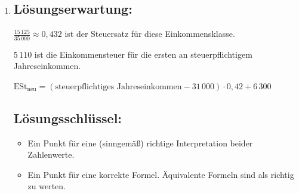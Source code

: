 \begin{langesbeispiel}
{\begin{enumerate}
\begin{itemize}
	\item Ein Punkt für eine (sinngemäß) richtige Begründung, warum die Behauptung (i) falsch ist.
	\item Ein Punkt für eine (sinngemäß) richtige Begründung, warum die Behauptung (ii) falsch ist.
\end{itemize}

\item \subsection{Lösungserwartung:}
			
$\frac{15\,125}{35\,000}\approx 0,432$ ist der Steuersatz für diese Einkommensklasse.

5\,110 ist die Einkommensteuer für die ersten  an steuerpflichtigem Jahreseinkommen.

$\text{ESt}_\text{neu}=(\text{steuerpflichtiges Jahreseinkommen}-31\,000)\cdot 0,42+6\,300$
	\subsection{Lösungsschlüssel:}
	
\begin{itemize}
	\item Ein Punkt für eine (sinngemäß) richtige Interpretation beider Zahlenwerte.
	\item Ein Punkt für eine korrekte Formel. Äquivalente Formeln sind als richtig zu werten.
\end{itemize}

\end{enumerate}}
		\end{langesbeispiel}